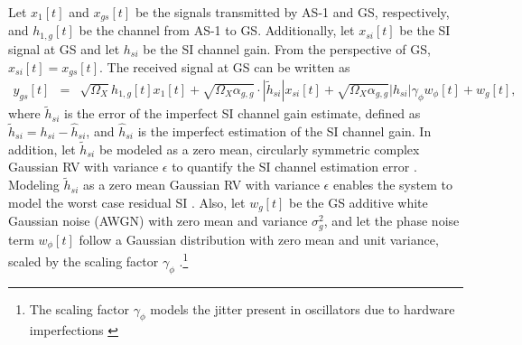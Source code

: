 Let $x_1[t]$ and $x_{gs}[t]$ be the signals transmitted by AS-1 and GS, respectively, and $h_{1,g}[t]$ be the channel from AS-1 to GS. Additionally, let $x_{si}[t]$ be the SI signal at GS and let $h_{si}$ be the SI channel gain. From the perspective of GS, $x_{si}[t]=x_{gs}[t]$. The received signal at GS can be written as 
\begin{eqnarray} \label{interference_management_HBD_ACS_y_gs}
y_{gs}[t] & = & \sqrt{\Omega_{X}}h_{1,g}[t]x_{1}[t] + \sqrt{\Omega_X\alpha_{g,g}} \cdot |\widetilde{h}_{si}|x_{si}[t] + \sqrt{\Omega_X\alpha_{g,g}}|h_{si}|\gamma_{\phi}w_{\phi}[t] + w_{g}[t],
\end{eqnarray}
where $\widetilde{h}_{si}$ is the error of the imperfect SI channel gain estimate, defined as $\widetilde{h}_{si}=h_{si}-\widehat{h}_{si}$, and $\widehat{h}_{si}$ is the imperfect estimation of the SI channel gain. In addition, let $\widetilde{h}_{si}$ be modeled as a zero mean, circularly symmetric complex Gaussian RV with variance $\epsilon$ to quantify the SI channel estimation error \cite{zlatanov2017capacity}. Modeling $\widetilde{h}_{si}$ as a zero mean Gaussian RV with variance $\epsilon$ enables the system to model the worst case residual SI \cite{zlatanov2017capacity}. Also, let $w_{g}[t]$ be the GS additive white Gaussian noise (AWGN) with zero mean and variance $\sigma^2_{g}$, and let the phase noise term $w_{\phi}[t]$ follow a Gaussian distribution with zero mean and unit variance, scaled by the scaling factor $\gamma_{\phi}$ \cite{sahai2013impact}.\footnote{The scaling factor $\gamma_{\phi}$ models the jitter present in oscillators due to hardware imperfections \cite{sahai2013impact}}

